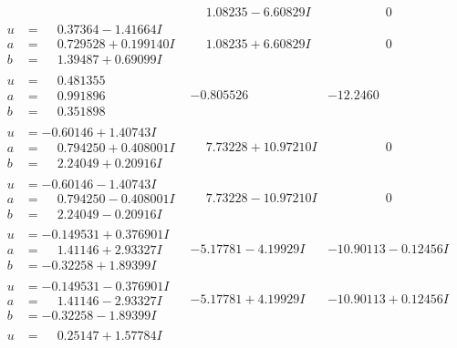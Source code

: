 \documentclass[1p]{elsarticle_modified}
\theoremstyle{definition}
\begin{document}
$$\begin{array}{c|c|c}
 & \phantom{-}1.08235 - 6.60829 I & \phantom{-0.000000 } 0 \\ \hline\begin{aligned}
u &= \phantom{-}0.37364 - 1.41664 I \\
a &= \phantom{-}0.729528 + 0.199140 I \\
b &= \phantom{-}1.39487 + 0.69099 I\end{aligned}
 & \phantom{-}1.08235 + 6.60829 I & \phantom{-0.000000 } 0 \\ \hline\begin{aligned}
u &= \phantom{-}0.481355\phantom{ +0.000000I} \\
a &= \phantom{-}0.991896\phantom{ +0.000000I} \\
b &= \phantom{-}0.351898\phantom{ +0.000000I}\end{aligned}
 & -0.805526\phantom{ +0.000000I} & -12.2460\phantom{ +0.000000I} \\ \hline\begin{aligned}
u &= -0.60146 + 1.40743 I \\
a &= \phantom{-}0.794250 + 0.408001 I \\
b &= \phantom{-}2.24049 + 0.20916 I\end{aligned}
 & \phantom{-}7.73228 + 10.97210 I & \phantom{-0.000000 } 0 \\ \hline\begin{aligned}
u &= -0.60146 - 1.40743 I \\
a &= \phantom{-}0.794250 - 0.408001 I \\
b &= \phantom{-}2.24049 - 0.20916 I\end{aligned}
 & \phantom{-}7.73228 - 10.97210 I & \phantom{-0.000000 } 0 \\ \hline\begin{aligned}
u &= -0.149531 + 0.376901 I \\
a &= \phantom{-}1.41146 + 2.93327 I \\
b &= -0.32258 + 1.89399 I\end{aligned}
 & -5.17781 - 4.19929 I & -10.90113 - 0.12456 I \\ \hline\begin{aligned}
u &= -0.149531 - 0.376901 I \\
a &= \phantom{-}1.41146 - 2.93327 I \\
b &= -0.32258 - 1.89399 I\end{aligned}
 & -5.17781 + 4.19929 I & -10.90113 + 0.12456 I \\ \hline\begin{aligned}
u &= \phantom{-}0.25147 + 1.57784 I \\

\end{aligned}
\end{array}$$
\end{document}
